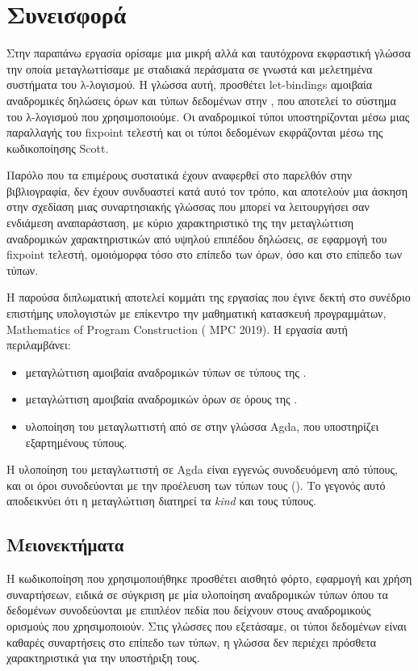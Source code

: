 \section{Συνεισφορά} Στην παραπάνω εργασία ορίσαμε μια μικρή αλλά και
ταυτόχρονα εκφραστική γλώσσα την οποία μεταγλωττίσαμε με σταδιακά περάσματα σε
γνωστά και μελετημένα συστήματα του λ-λογισμού.  Η γλώσσα αυτή, \FIR{}
προσθέτει let-bindings αμοιβαία αναδρομικές δηλώσεις όρων και τύπων δεδομένων
στην \FOMF, που αποτελεί το σύστημα του λ-λογισμού που χρησιμοποιούμε. Οι
αναδρομικοί τύποι υποστηρίζονται μέσω μιας παραλλαγής του fixpoint τελεστή και
οι τύποι δεδομένων εκφράζονται μέσω της κωδικοποίησης Scott.

Παρόλο που τα επιμέρους συστατικά έχουν αναφερθεί στο παρελθόν στην
βιβλιογραφία, δεν έχουν συνδυαστεί κατά αυτό τον τρόπο, και αποτελούν μια
άσκηση στην σχεδίαση μιας συναρτησιακής γλώσσας που μπορεί να λειτουργήσει σαν
ενδιάμεση αναπαράσταση, με κύριο χαρακτηριστικό της την μεταγλώττιση
αναδρομικών χαρακτηριστικών από υψηλού επιπέδου δηλώσεις, σε εφαρμογή του
fixpoint τελεστή, ομοιόμορφα τόσο στο επίπεδο των όρων, όσο και στο επίπεδο των
τύπων.

Η παρούσα διπλωματική αποτελεί κομμάτι της εργασίας που έγινε δεκτή στο
συνέδριο επιστήμης υπολογιστών με επίκεντρο την μαθηματική κατασκευή
προγραμμάτων, Mathematics of Program Construction ( MPC 2019).  Η εργασία αυτή
περιλαμβάνει: \begin{itemize} \item μεταγλώττιση αμοιβαία αναδρομικών τύπων σε
      τύπους της \FOMF{}.  \item μεταγλώττιση αμοιβαία αναδρομικών όρων σε
      όρους της \FOMF{}.  \item υλοποίηση του μεταγλωττιστή από \FIR{} σε
        \FOMF{} στην γλώσσα Agda, που υποστηρίζει εξαρτημένους τύπους.
\end{itemize} Η υλοποίηση του μεταγλωττιστή σε Agda είναι εγγενώς συνοδευόμενη
από τύπους, και οι όροι συνοδεύονται με την προέλευση των τύπων τους
(\cite{altenkirch}). Το γεγονός αυτό αποδεικνύει ότι η μεταγλώττιση διατηρεί τα
\emph{kind} και τους τύπους.


\subsection{Μειονεκτήματα}

Η κωδικοποίηση που χρησιμοποιήθηκε προσθέτει αισθητό φόρτο, εφαρμογή και χρήση
συναρτήσεων, ειδικά σε σύγκριση με μία υλοποίηση αναδρομικών τύπων όπου τα
δεδομένων συνοδεύονται με επιπλέον πεδία που δείχνουν στους αναδρομικούς
ορισμούς που χρησιμοποιούν. Στις γλώσσες που εξετάσαμε, οι τύποι δεδομένων
είναι καθαρές συναρτήσεις στο επίπεδο των τύπων, η γλώσσα δεν περιέχει πρόσθετα
χαρακτηριστικά για την υποστήριξη τους.


